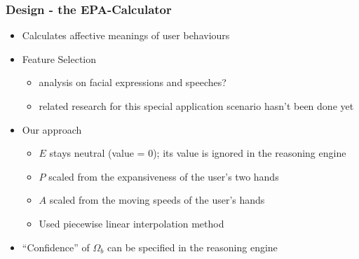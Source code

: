 \documentclass{beamer}
\begin{document}
\begin{frame}
\frametitle{Design - the EPA-Calculator}
\begin{itemize}
\item Calculates affective meanings of user behaviours
\vspace{.3cm}
\item Feature Selection
\begin{itemize}
\item analysis on facial expressions and speeches?
\item related research for this special application scenario hasn't been done yet
\end{itemize}
\pause
\vspace{.3cm}
\item Our approach
\begin{itemize}
\item $E$ stays neutral (value = 0); its value is ignored in the reasoning engine
\item $P$ scaled from the expansiveness of the user's two hands
\item $A$ scaled from the moving speeds of the user's hands
\item Used piecewise linear interpolation method
\end{itemize}
\vspace{.3cm}
\item ``Confidence'' of $\Omega_b$ can be specified in the reasoning engine
\end{itemize}
\end{frame}
\end{document}
